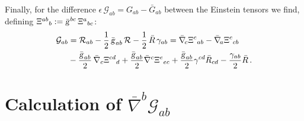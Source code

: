\documentclass[a4paper,showkeys,aps,prd,reprint,nofootinbib,showpacs,twocolumn]{revtex4-1}
\newcommand{\eq}[1]{\( #1 \)}
\newcommand{\speq}[1]{\begin{equation}\begin{split}#1\end{split}\end{equation}}
\newcommand{\Cal}[1]{\mathcal{#1}}
\newcommand{\matg}{\text{\textsl{g}}}%
\theoremstyle{plain}
\begin{document}
Finally, for the difference \eq{\epsilon \, \Cal{G}_{ab} = G_{ab} - \bar{G}_{ab}} between the Einstein tensors we find, defining \eq{{\Xi^{ab}}_{b} := \bar{\matg}^{bc} \, {\Xi^a}_{bc}}:
%
\speq{\Cal{G}_{ab} &= \Cal{R}_{ab} - \frac{1}{2} \, \bar{\matg}_{ab} \, \Cal{R} - \frac{1}{2} \, \bar{R} \, \gamma_{ab} = \bar{\nabla}_{\! c} {\Xi^c}_{ab} - \bar{\nabla}_{\! a} {\Xi^c}_{cb} \\
&- \frac{\bar{\matg}_{ab}}{2} \, \bar{\nabla}_{c} {\Xi^{cd}}_{d} + \frac{\bar{\matg}_{ab}}{2} \bar{\nabla}^{c} {\Xi^e}_{ec} + \frac{\bar{\matg}_{ab}}{2} \gamma^{cd} \bar{R}_{cd} - \frac{\gamma_{ab}}{2} \bar{R} \,. \label{G1}}
%


\section{Calculation of $\bar{\nabla}^b \Cal{G}_{ab}$}
\label{App:B}
\end{document}
